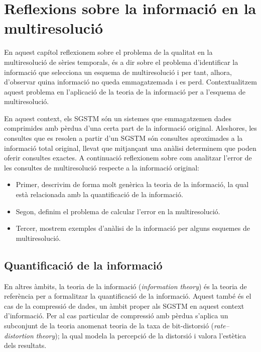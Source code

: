 \chapter{Reflexions sobre la informació en la multiresolució}
\label{sec:multiresolucio:teoriainformacio}



En aquest capítol reflexionem sobre el problema de la qualitat en la
multiresolució de sèries temporals, és a dir sobre el problema
d'identificar la informació que selecciona un esquema de
multiresolució i per tant, alhora, d'observar quina informació no
queda emmagatzemada i es perd.  Contextualitzem aquest problema en
l'aplicació de la teoria de la informació per a l'esquema de
multiresolució.

En aquest context, els \gls{SGSTM} són un sistemes que emmagatzemen
dades comprimides amb pèrdua d'una certa part de la informació
original. Aleshores, les consultes que es resolen a partir d'un
\gls{SGSTM} són consultes aproximades a la informació total original,
llevat que mitjançant una anàlisi determinem que poden oferir
consultes exactes. A continuació reflexionem sobre com analitzar
l'error de les consultes de multiresolució respecte a la informació
original:
\begin{itemize}
\item Primer, descrivim de forma molt genèrica la teoria de la
  informació, la qual està relacionada amb la quantificació de la
  informació.
\item Segon, definim el problema de calcular l'error en la multiresolució.
\item Tercer, mostrem exemples d'anàlisi de la informació per alguns
  esquemes de multiresolució.
\end{itemize}






\section{Quantificació de la informació}

En altres àmbits, la teoria de la informació (\emph{information
  theory}) és la teoria de referència per a formalitzar la
quantificació de la informació. Aquest també és el cas de la
compressió de dades, un àmbit proper als \gls{SGSTM} en aquest context
d'informació.  Per al cas particular de compressió amb pèrdua s'aplica
un subconjunt de la teoria anomenat teoria de la taxa de
bit-distorsió %
(\emph{rate–distortion theory}); la qual modela la percepció de la
distorsió i valora l'estètica dels resultats.



